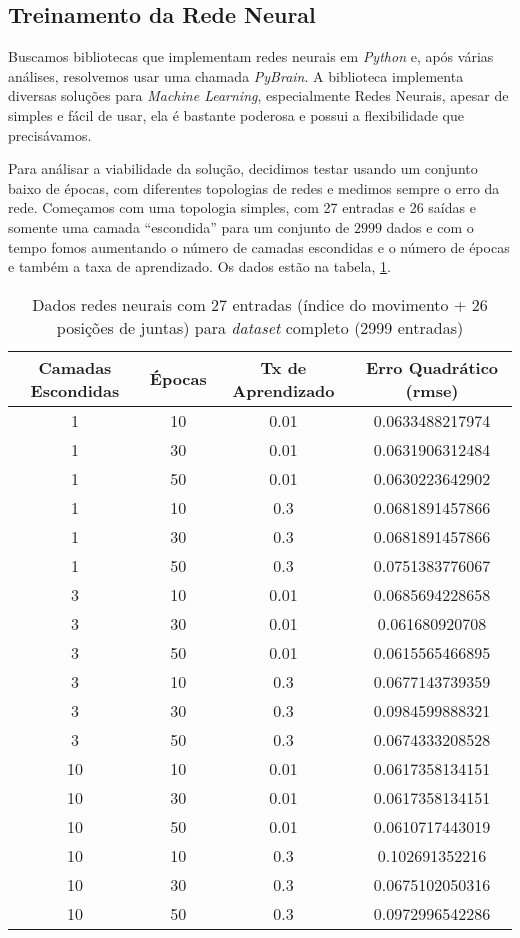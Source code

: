 \documentclass[twoside,conference,a4paper]{IEEEtran}
\begin{document}
\subsection{Treinamento da Rede Neural}

Buscamos bibliotecas que implementam redes neurais em \textsl{Python} e, após várias análises, resolvemos usar uma chamada \textsl{PyBrain}\cite{pybrain}. A biblioteca implementa diversas soluções para \textsl{Machine Learning}, especialmente Redes Neurais, apesar de simples e fácil de usar, ela é bastante poderosa e possui a flexibilidade que precisávamos.

Para análisar a viabilidade da solução, decidimos testar usando um conjunto baixo de épocas, com diferentes topologias de redes e medimos sempre o erro da rede. Começamos com uma topologia simples, com 27 entradas e 26 saídas e somente uma camada ``escondida'' para um conjunto de $2999$ dados e com o tempo fomos aumentando o número de camadas escondidas e o número de épocas e também a taxa de aprendizado. Os dados estão na tabela, \ref{redes_neurais_tabela_1}.


 \begin{table}[h]
 \caption{Dados redes neurais com 27 entradas (índice do movimento + 26 posições de juntas) para \textsl{dataset} completo (2999 entradas)}
 \label{redes_neurais_tabela_1}
 \begin{center}
 \begin{tabular}{|c|c|c|c|}
 \hline
 Camadas Escondidas & Épocas & Tx de Aprendizado & Erro Quadrático (rmse) \\
 \hline
 1 & 10 & 0.01 & 0.0633488217974 \\
 1 & 30 & 0.01 & 0.0631906312484 \\
 1 & 50 & 0.01 & 0.0630223642902 \\
 1 & 10 & 0.3 & 0.0681891457866 \\
 1 & 30 & 0.3 & 0.0681891457866 \\
 1 & 50 & 0.3 & 0.0751383776067 \\
 3 & 10 &  0.01 & 0.0685694228658 \\
 3 &  30 & 0.01 & 0.061680920708 \\
 3 &  50 & 0.01 & 0.0615565466895 \\
 3 & 10 &  0.3 & 0.0677143739359 \\
 3 &  30 & 0.3 & 0.0984599888321 \\
 3 &  50 & 0.3 & 0.0674333208528 \\
 10 & 10 & 0.01 & 0.0617358134151\\
10 &  30 & 0.01 &  0.0617358134151\\
10 &  50 & 0.01 & 0.0610717443019 \\
10 & 10 & 0.3  & 0.102691352216 \\
10 &  30 & 0.3 & 0.0675102050316 \\
10 &  50 & 0.3 & 0.0972996542286 \\
 \hline
 \end{tabular}
 \end{center}
 \end{table}
\end{document}
